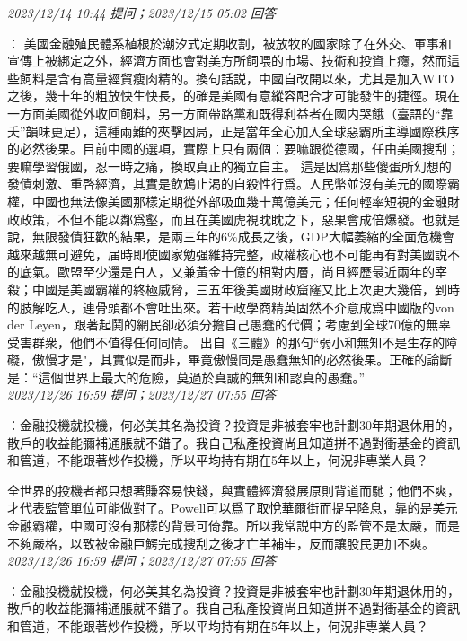 \documentclass[twocolumn]{ctexart}
\begin{document}
\textit{\hfill\noindent\small 2023/12/14 10:44 提问；2023/12/15 05:02 回答}

：
美國金融殖民體系植根於潮汐式定期收割，被放牧的國家除了在外交、軍事和宣傳上被綁定之外，經濟方面也會對美方所飼喂的市場、技術和投資上癮，然而這些飼料是含有高量經貿瘦肉精的。換句話説，中國自改開以來，尤其是加入WTO之後，幾十年的粗放快生快長，的確是美國有意縱容配合才可能發生的捷徑。現在一方面美國從外收回飼料，另一方面帶路黨和既得利益者在國内哭餓（臺語的“靠夭”韻味更足），這種兩難的夾擊困局，正是當年全心加入全球惡霸所主導國際秩序的必然後果。目前中國的選項，實際上只有兩個：要嘛跟從德國，任由美國搜刮；要嘛學習俄國，忍一時之痛，換取真正的獨立自主。
這是因爲那些傻蛋所幻想的發債刺激、重啓經濟，其實是飲鴆止渴的自殺性行爲。人民幣並沒有美元的國際霸權，中國也無法像美國那樣定期從外部吸血幾十萬億美元；任何輕率短視的金融財政政策，不但不能以鄰爲壑，而且在美國虎視眈眈之下，惡果會成倍爆發。也就是說，無限發債狂歡的結果，是兩三年的6\%成長之後，GDP大幅萎縮的全面危機會越來越無可避免，届時即使國家勉强維持完整，政權核心也不可能再有對美國説不的底氣。歐盟至少還是白人，又兼黃金十億的相對内層，尚且經歷最近兩年的宰殺；中國是美國霸權的終極威脅，三五年後美國財政窟窿又比上次更大幾倍，到時的肢解吃人，連骨頭都不會吐出來。若干政學商精英固然不介意成爲中國版的von der Leyen，跟著起鬨的網民卻必須分擔自己愚蠢的代價；考慮到全球70億的無辜受害群衆，他們不值得任何同情。
出自《三體》的那句“弱小和無知不是生存的障礙，傲慢才是"，其實似是而非，畢竟傲慢同是愚蠢無知的必然後果。正確的論斷是：“這個世界上最大的危險，莫過於真誠的無知和認真的愚蠢。”
\\

\textit{\hfill\noindent\small 2023/12/26 16:59 提问；2023/12/27 07:55 回答}

：金融投機就投機，何必美其名為投資？投資是非被套牢也計劃30年期退休用的，散戶的收益能彌補通脹就不錯了。我自己私產投資尚且知道拼不過對衝基金的資訊和管道，不能跟著炒作投機，所以平均持有期在5年以上，何況非專業人員？

全世界的投機者都只想著賺容易快錢，與實體經濟發展原則背道而馳；他們不爽，才代表監管單位可能做對了。Powell可以爲了取悅華爾街而提早降息，靠的是美元金融霸權，中國可沒有那樣的背景可倚靠。所以我常説中方的監管不是太嚴，而是不夠嚴格，以致被金融巨鰐完成搜刮之後才亡羊補牢，反而讓股民更加不爽。
\\

\textit{\hfill\noindent\small 2023/12/26 16:59 提问；2023/12/27 07:55 回答}

：金融投機就投機，何必美其名為投資？投資是非被套牢也計劃30年期退休用的，散戶的收益能彌補通脹就不錯了。我自己私產投資尚且知道拼不過對衝基金的資訊和管道，不能跟著炒作投機，所以平均持有期在5年以上，何況非專業人員？
\end{document}
